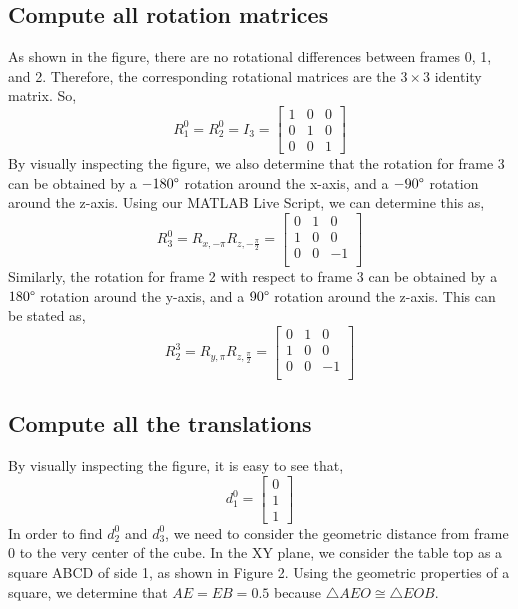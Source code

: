 \documentclass[conference]{IEEEtran}
\begin{document}
\subsection{Compute all rotation matrices}
As shown in the figure, there are no rotational differences between frames
0, 1, and 2. Therefore, the corresponding rotational matrices are the
$3 \times 3$ identity matrix. So,
\[
    R^0_1 = R^0_2 = I_3 = \begin{bmatrix}
        1 & 0 & 0\\
        0 & 1 & 0\\
        0 & 0 & 1
    \end{bmatrix}
\]
By visually inspecting the figure, we also determine that the rotation for frame 3
can be obtained by a $-180\degree$ rotation around the x-axis, and a
$-90\degree$ rotation around the z-axis. Using our MATLAB Live Script,
we can determine this as,
\[
    R^0_3 = R_{x,-\pi} R_{z,-\frac{\pi}{2}} = \begin{bmatrix}
        0 & 1 & 0\\
        1 & 0 & 0\\
        0 & 0 & -1\\
    \end{bmatrix}
\]
Similarly, the rotation for frame 2 with respect to frame 3 can be obtained
by a $180\degree$ rotation around the y-axis, and a $90\degree$ rotation around
the z-axis. This can be stated as,
\[
    R^3_2 = R_{y,\pi}R_{z,\frac{\pi}{2}} = \begin{bmatrix}
        0 & 1 & 0\\
        1 & 0 & 0\\
        0 & 0 & -1\\
    \end{bmatrix}
\]

\subsection{Compute all the translations}
By visually inspecting the figure, it is easy to see that,
\[
    d^0_1 = \begin{bmatrix}
        0\\
        1\\
        1
    \end{bmatrix}
\]
In order to find $d^0_2$ and $d^0_3$, we need to consider
the geometric distance from frame 0 to the very center of the cube.
In the XY plane, we consider the table top as a square ABCD of side 1,
as shown in Figure 2. Using the geometric properties of a square, we
determine that $AE = EB = 0.5$ because $\triangle AEO \cong \triangle EOB$.
\end{document}
